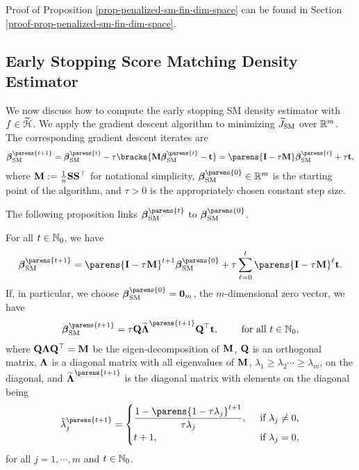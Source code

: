 Proof of Proposition \ref{prop-penalized-sm-fin-dim-space} can be found in Section \ref{proof-prop-penalized-sm-fin-dim-space}. 

\subsection{Early Stopping Score Matching Density Estimator}

We now discuss how to compute the early stopping SM density estimator with $f \in \widetilde{\mathcal{H}}$. We apply the gradient descent algorithm to minimizing $\widetilde{J}_{\mathrm{SM}}$ over $\mathbb{R}^m$. The corresponding gradient descent iterates are 
\begin{align}\label{eq-early-stop-sm-fin-dim-space-iterate}
	\bbeta_{\SM}^{\parens{t+1}} = \bbeta_{\SM}^{\parens{t}} - \tau \bracks{ \bM \bbeta_{\SM}^{\parens{t}} - \bt } = \parens{\bI - \tau \bM} \bbeta_{\SM}^{\parens{t}} + \tau \bt, 
\end{align}
where $\mathbf{M} := \frac{1}{n} \mathbf{S} \mathbf{S}^\top$ for notational simplicity, $\bbeta_{\SM}^{\parens{0}} \in \Real^m$ is the starting point of the algorithm, and $\tau > 0$ is the appropriately chosen constant step size. 

The following proposition links $\bbeta_{\SM}^{\parens{t}}$ to $\bbeta_{\SM}^{\parens{0}}$. 

\begin{proposition}\label{prop-early-stop-sm-fin-dim-space}
	For all $t \in \mathbb{N}_0$, we have 
	\begin{align}\label{eq-prop-early-stop-sm-fin-dim-space-1}
		\bbeta_{\SM}^{\parens{t+1}} = \parens{\bI - \tau \bM}^{t+1} \bbeta_{\SM}^{\parens{0}} + \tau \sum_{\ell=0}^{t} \parens{\bI - \tau \bM}^{\ell} \bt. 
	\end{align}
	If, in particular, we choose $\bbeta_{\SM}^{\parens{0}} = \boldzero_m$, the $m$-dimensional zero vector, we have 
	\begin{align}\label{eq-prop-early-stop-sm-fin-dim-space-2}
		\bbeta_{\SM}^{\parens{t+1}} = \tau \bQ \widetilde{\bLambda}^{\parens{t+1}} \bQ^\top \bt, \qquad \text{ for all } t \in \Natural_0, 
	\end{align}
	where $\mathbf{Q} \boldsymbol{\Lambda} \mathbf{Q}^\top = \mathbf{M}$ be the eigen-decomposition of $\mathbf{M}$, $\mathbf{Q}$ is an orthogonal matrix, $\boldsymbol{\Lambda}$ is a diagonal matrix with all eigenvalues of $\mathbf{M}$, $\lambda_1 \ge \lambda_2 \cdots \ge \lambda_m$, on the diagonal, and $\widetilde{\bLambda}^{\parens{t+1}}$ is the diagonal matrix with elements on the diagonal being 
	\begin{align*}
		\tilde{\lambda}_j^{\parens{t+1}} = \begin{cases}
			\dfrac{1 - \parens{1 - \tau \lambda_j}^{t+1}}{\tau \lambda_j}, & \, \text{ if } \lambda_j \neq 0, \\ 
			t + 1, & \, \text{ if } \lambda_j = 0, 
		\end{cases}
	\end{align*}
	for all $j = 1, \cdots, m$ and $t \in \mathbb{N}_0$. 
\end{proposition}

